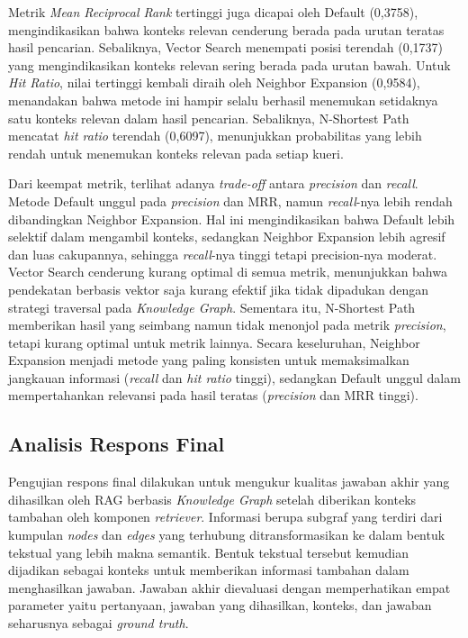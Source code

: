 Metrik \textit{Mean Reciprocal Rank} tertinggi juga dicapai oleh Default (0,3758), mengindikasikan bahwa konteks relevan cenderung berada pada urutan teratas hasil pencarian.
Sebaliknya, Vector Search menempati posisi terendah (0,1737) yang mengindikasikan konteks relevan sering berada pada urutan bawah.
Untuk \textit{Hit Ratio}, nilai tertinggi kembali diraih oleh Neighbor Expansion (0,9584), menandakan bahwa metode ini hampir selalu berhasil menemukan setidaknya satu konteks relevan dalam hasil pencarian.
Sebaliknya, N-Shortest Path mencatat \textit{hit ratio} terendah (0,6097), menunjukkan probabilitas yang lebih rendah untuk menemukan konteks relevan pada setiap kueri.

Dari keempat metrik, terlihat adanya \textit{trade-off} antara \textit{precision} dan \textit{recall}.
Metode Default unggul pada \textit{precision} dan MRR, namun \textit{recall}-nya lebih rendah dibandingkan Neighbor Expansion.
Hal ini mengindikasikan bahwa Default lebih selektif dalam mengambil konteks, sedangkan Neighbor Expansion lebih agresif dan luas cakupannya, sehingga \textit{recall}-nya tinggi tetapi precision-nya moderat.
Vector Search cenderung kurang optimal di semua metrik, menunjukkan bahwa pendekatan berbasis vektor saja kurang efektif jika tidak dipadukan dengan strategi traversal pada \textit{Knowledge Graph}.
Sementara itu, N-Shortest Path memberikan hasil yang seimbang namun tidak menonjol pada metrik \textit{precision}, tetapi kurang optimal untuk metrik lainnya.
Secara keseluruhan, Neighbor Expansion menjadi metode yang paling konsisten untuk memaksimalkan jangkauan informasi (\textit{recall} dan \textit{hit ratio} tinggi), sedangkan Default unggul dalam mempertahankan relevansi pada hasil teratas (\textit{precision} dan MRR tinggi).

\subsection{Analisis Respons Final}
Pengujian respons final dilakukan untuk mengukur kualitas jawaban akhir yang dihasilkan oleh RAG berbasis \textit{Knowledge Graph} setelah diberikan konteks tambahan oleh komponen \textit{retriever}.
Informasi berupa subgraf yang terdiri dari kumpulan \textit{nodes} dan \textit{edges} yang terhubung ditransformasikan ke dalam bentuk tekstual yang lebih makna semantik.
Bentuk tekstual tersebut kemudian dijadikan sebagai konteks untuk memberikan informasi tambahan dalam menghasilkan jawaban.
Jawaban akhir dievaluasi dengan memperhatikan empat parameter yaitu pertanyaan, jawaban yang dihasilkan, konteks, dan jawaban seharusnya sebagai \textit{ground truth}.

